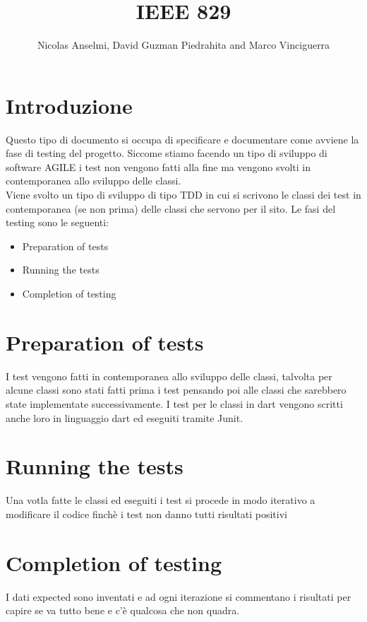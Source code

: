 \documentclass{article}
\title{IEEE 829}
\author{Nicolas Anselmi, David Guzman Piedrahita and Marco Vinciguerra}
\begin{document}
\maketitle
\section{Introduzione}
Questo tipo di documento si occupa di specificare e documentare come avviene la fase di testing
del progetto. Siccome stiamo facendo un tipo di sviluppo di software AGILE i test non vengono
fatti alla fine ma vengono svolti in contemporanea allo sviluppo delle classi.
\\Viene svolto un tipo di sviluppo di tipo TDD in cui si scrivono le classi dei test in 
contemporanea (se non prima) delle classi che servono per il sito. Le fasi del testing sono le 
seguenti:
\begin{itemize}
    \item Preparation of tests 
    \item Running the  tests
    \item Completion of testing
\end{itemize}

\section{Preparation of tests}
I test vengono fatti in contemporanea allo sviluppo delle classi, talvolta per alcune classi
sono stati fatti prima i test pensando poi alle classi che sarebbero state implementate successivamente.
I test per le classi in dart vengono scritti anche loro in linguaggio dart ed eseguiti tramite Junit.

\section{Running the tests}
Una votla fatte le classi ed eseguiti i test si procede in modo iterativo a modificare il codice
finchè i test non danno tutti risultati positivi

\section{Completion of testing}
I dati expected sono inventati e ad ogni iterazione si commentano i risultati per capire 
se va tutto bene e c'è qualcosa che non  quadra.
\end{document}

